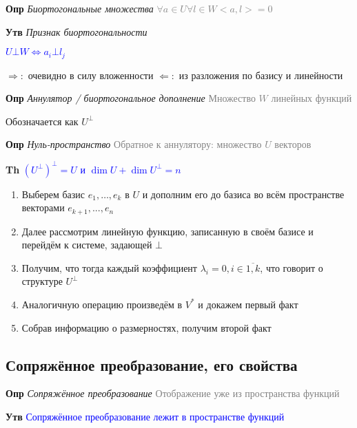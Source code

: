 \documentclass[a4paper, 14pt]{article}
\begin{document}
    \textbf{Опр} \textit{Биортогональные множества} \textcolor{gray}{$\forall a \in U \forall l \in W <a, l> = 0$}

    \textbf{Утв} \textit{Признак биортогональности}

    \textcolor{blue}{$U \bot W \Leftrightarrow a_i \bot l_j$}

    $\Rightarrow:$ очевидно в силу вложенности
    $\Leftarrow:$ из разложения по базису и линейности

    \textbf{Опр} \textit{Аннулятор / биортогональное дополнение} \textcolor{gray}{Множество $W$ линейных функций}

    Обозначается как $U^\bot$


    \textbf{Опр} \textit{Нуль-пространство} \textcolor{gray}{Обратное к аннулятору: множество $U$ векторов}


    \textbf{Th} \textcolor{blue}{$(U^\bot)^\bot = U$ и $\dim U + \dim U^\bot = n$}

    \begin{enumerate}
        \item Выберем базис $e_1, \dots, e_k$ в $U$ и дополним его до базиса во всём пространстве векторами $e_{k+1}, .
        .., e_n$
        \item Далее рассмотрим линейную функцию, записанную в своём базисе и перейдём к системе, задающей $\bot$
        \item Получим, что тогда каждый коэффициент $\lambda_i = 0, i \in \overline{1, k}$, что говорит о структуре $
        U^\bot$
        \item Аналогичную операцию произведём в $V^*$ и докажем первый факт
        \item Собрав информацию о размерностях, получим второй факт
    \end{enumerate}

    \subsection{Сопряжённое преобразование, его свойства}

    \textbf{Опр} \textit{Сопряжённое преобразование} \textcolor{gray}{Отображение уже из пространства функций}

    \textbf{Утв} \textcolor{blue}{Сопряжённое преобразование лежит в пространстве функций}
\end{document}
